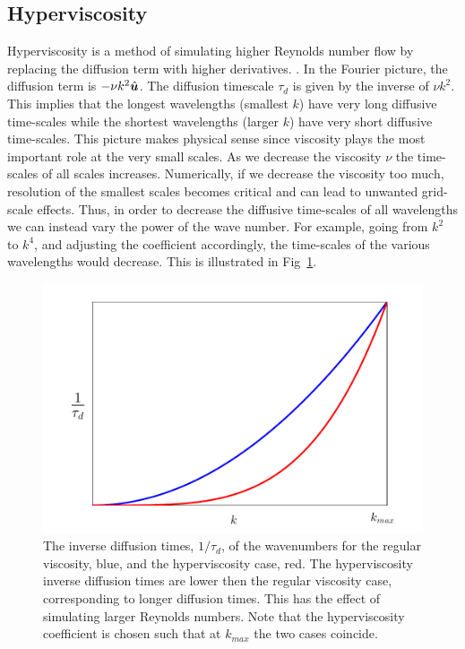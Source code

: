 \subsection{Hyperviscosity}
Hyperviscosity is a method of simulating higher Reynolds number flow by replacing the diffusion term with higher derivatives. . In the Fourier picture, the diffusion term is $-\nu k^{2}\hat{\bm{u}}$. The diffusion timescale $\tau_{d}$ is given by the inverse of $\nu k^{2}$. This implies that the longest wavelengths (smallest $k$) have very long diffusive time-scales while the shortest wavelengths (larger $k$) have very short diffusive time-scales. This picture makes physical sense since viscosity plays the most important role at the very small scales. As we decrease the viscosity $\nu$ the time-scales of all scales increases. Numerically, if we decrease the viscosity too much, resolution of the smallest scales becomes critical and can lead to unwanted grid-scale effects. Thus, in order to decrease the diffusive time-scales of all wavelengths we can instead vary the power of the wave number. For example, going from $k^{2}$ to $k^{4}$, and adjusting the coefficient accordingly, the time-scales of the various wavelengths would decrease. This is illustrated in Fig~\ref{hyper_vis_example}.

\begin{figure}
\begin{center}
\includegraphics[width=\textwidth]{hyper_vis_example.pdf}
\caption{The inverse diffusion times, $1/\tau_{d}$, of the wavenumbers for the regular viscosity, blue, and the hyperviscosity case, red. The hyperviscosity inverse diffusion times are lower then the regular viscosity case, corresponding to longer diffusion times. This has the effect of simulating larger Reynolds numbers. Note that the hyperviscosity coefficient is chosen such that at $k_{max}$ the two cases coincide.}
\label{hyper_vis_example}
\end{center}
\end{figure}


